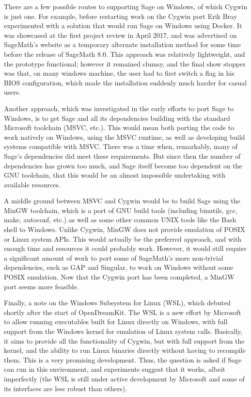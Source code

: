 There are a few possible routes to supporting Sage on Windows, of which
Cygwin is just one. For example, before restarting work on the Cygwin
port Erik Bray experimented with a solution that would run Sage on
Windows using Docker.
It was showcased at the first project review in
April 2017, and was advertised on SageMath's website as a temporary
alternate installation method for some time before the release of
SageMath 8.0.
This approach was relatively lightweight, and the prototype functional;
however it remained clumsy, and the final show stopper was that, on many
windows machine, the user had to first switch a flag in his BIOS
configuration, which made the installation suddenly much harder for
casual users.

Another approach, which was investigated in the early efforts to port Sage
to Windows, is to get Sage and all its dependencies building with
the standard Microsoft toolchain (MSVC, etc.). This would mean both
porting the code to work natively on Windows, using the MSVC runtime, as
well as developing build systems compatible with MSVC. There was a time
when, remarkably, many of Sage's dependencies did meet these
requirements. But since then the number of dependencies has grown too
much, and Sage itself become too dependent on the GNU toolchain, that
this would be an almost impossible undertaking with available resources.

A middle ground between MSVC and Cygwin would be to build Sage using the
MinGW toolchain, which is a port of GNU build tools (including binutils,
gcc, make, autoconf, etc.) as well as some other common UNIX tools like
the Bash shell to Windows. Unlike Cygwin, MinGW does not provide
emulation of POSIX or Linux system APIs. This would actually be the
preferred approach, and with enough time and resources it could probably
work. However, it would still require a significant amount of work to
port some of SageMath's more non-trivial dependencies, such as GAP and
Singular, to work on Windows without some POSIX emulation. Now that the
Cygwin port has been completed, a MinGW port seems more feasible.

Finally, a note on the Windows Subsystem for Linux (WSL), which debuted shortly
after the start of OpenDreamKit. The WSL is a new effort by Microsoft to allow
running executables built for Linux directly on Windows, with full support from
the Windows kernel for emulation of Linux system calls. Basically, it aims to
provide all the functionality of Cygwin, but with full support from the kernel,
and the ability to run Linux binaries directly without having to recompile
them. This is a very promising development. Thus, the question is asked if Sage
can run in this environment, and experiments suggest that it works, albeit
imperfectly (the WSL is still under active development by Microsoft and some of
its interfaces are less robust than others).

